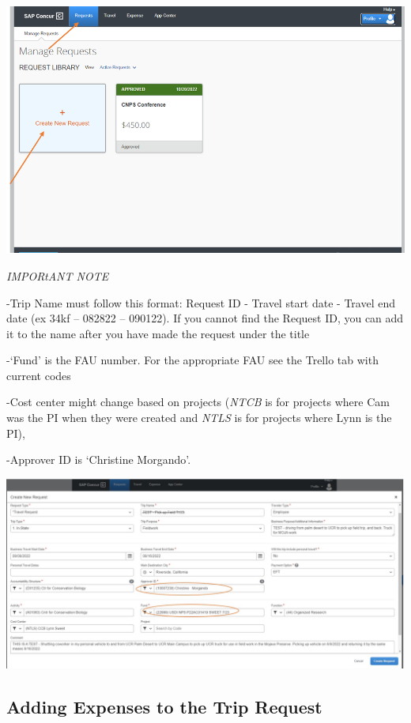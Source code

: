 \documentclass[
]{book}
\begin{document}
\begin{flushleft}\includegraphics{images/concur1} \end{flushleft}

\emph{IMPORtANT NOTE}

-Trip Name must follow this format: Request ID - Travel start date - Travel end date (ex 34kf -- 082822 -- 090122). If you cannot find the Request ID, you can add it to the name after you have made the request under the title

-`Fund' is the FAU number. For the appropriate FAU see the Trello tab with current codes

-Cost center might change based on projects (\emph{NTCB} is for projects where Cam was the PI when they were created and \emph{NTLS} is for projects where Lynn is the PI),

-Approver ID is `Christine Morgando'.

\begin{flushleft}\includegraphics{images/concur2a} \end{flushleft}

\hypertarget{adding-expenses-to-the-trip-request}{%
\subsection{Adding Expenses to the Trip Request}\label{adding-expenses-to-the-trip-request}}
\end{document}
